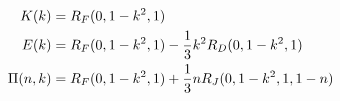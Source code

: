\documentclass[12pt]{article}
\begin{document}
\begin{align}
K(k) &= R_F(0, 1-k^2, 1) \notag \\
E(k) &= R_F(0, 1-k^2, 1) - \frac{1}{3}k^2R_D(0, 1-k^2, 1) \notag \\
\Pi(n, k) &= R_F(0, 1-k^2, 1) + \frac{1}{3}nR_J(0, 1-k^2, 1, 1-n) \notag
\end{align}
\end{document}
